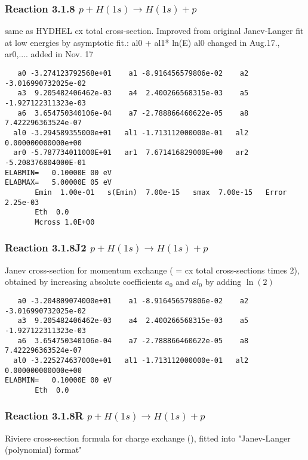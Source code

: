 \documentclass[12pt,dvipdfmx]{article}
\begin{document}
\subsubsection{
Reaction 3.1.8 $  p + H(1s) \rightarrow H(1s) + p  $
}
same as HYDHEL cx total cross-section.
Improved from original Janev-Langer fit at low energies by asymptotic fit.:  al0 + al1* ln(E)
al0 changed in Aug.17., ar0,.... added in Nov. 17

\begin{small}\begin{verbatim}
   a0 -3.274123792568e+01    a1 -8.916456579806e-02    a2 -3.016990732025e-02
   a3  9.205482406462e-03    a4  2.400266568315e-03    a5 -1.927122311323e-03
   a6  3.654750340106e-04    a7 -2.788866460622e-05    a8  7.422296363524e-07
  al0 -3.294589355000e+01   al1 -1.713112000000e-01   al2  0.000000000000e+00
  ar0 -5.787734011000E+01   ar1  7.671416829000E+00   ar2 -5.208376804000E-01
ELABMIN=   0.10000E 00 eV
ELABMAX=   5.00000E 05 eV
       Emin  1.00e-01   s(Emin)  7.00e-15   smax  7.00e-15   Error  2.25e-03
       Eth  0.0
       Mcross 1.0E+00
\end{verbatim}\end{small}
\subsubsection{
Reaction 3.1.8J2 $  p + H(1s) \rightarrow H(1s) + p  $
}
Janev cross-section for momentum exchange ( = cx total cross-sections times 2), obtained by
increasing absolute coefficients $a_0$ and $al_0$  by adding $\ln(2)$

\begin{small}\begin{verbatim}
   a0 -3.204809074000e+01    a1 -8.916456579806e-02    a2 -3.016990732025e-02
   a3  9.205482406462e-03    a4  2.400266568315e-03    a5 -1.927122311323e-03
   a6  3.654750340106e-04    a7 -2.788866460622e-05    a8  7.422296363524e-07
  al0 -3.225274637000e+01   al1 -1.713112000000e-01   al2  0.000000000000e+00
ELABMIN=   0.10000E 00 eV
       Eth  0.0
\end{verbatim}\end{small}
\subsubsection{
Reaction 3.1.8R $  p + H(1s) \rightarrow H(1s) + p  $
}
Riviere cross-section formula for charge exchange
(\cite{kn:Riviere}), fitted into
"Janev-Langer (polynomial) format" \cite{kn:Janev}
\end{document}
